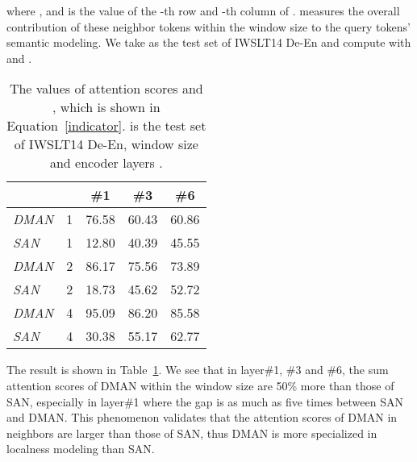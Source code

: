 \documentclass[11pt]{article}
\begin{document}
where , and  is the value of the -th row and -th column of .  measures the overall contribution of these neighbor tokens within the window size  to the query tokens' semantic modeling. We take  as the test set of IWSLT14 De-En and compute  with  and . 

\begin{table}
\begin{center}
\begin{tabular}{l|c|ccc}
\midrule[1.0pt]
	& &\#1 &\#3	&\#6 \\
\midrule[1.0pt]
\emph{DMAN}	&1	&76.58	&60.43	&60.86 \\
\emph{SAN}	&1  &12.80	&40.39	&45.55 \\
\midrule[0.5pt]
\emph{DMAN}	&2  &86.17	&75.56	&73.89 \\
\emph{SAN}	&2  &18.73	&45.62	&52.72 \\
\midrule[0.5pt]
\emph{DMAN}	&4  &95.09	&86.20	&85.58 \\
\emph{SAN}	&4  &30.38	&55.17	&62.77 \\
\midrule[1.0pt]
\end{tabular}
\end{center}
\caption{The values of attention scores  and , which is shown in Equation~\ref{indicator}.  is the test set of IWSLT14 De-En, window size  and encoder layers . }
\label{localnessDMAN}
\end{table}

 The result is shown in Table~\ref{localnessDMAN}. We see that in layer\#1, \#3 and \#6, the sum attention scores of DMAN within the window size  are 50\% more than those of SAN, especially in layer\#1 where the gap is as much as five times between SAN and DMAN. This phenomenon validates that the attention scores of DMAN in neighbors are larger than those of SAN, thus DMAN is more specialized in localness modeling than SAN. 
\end{document}
